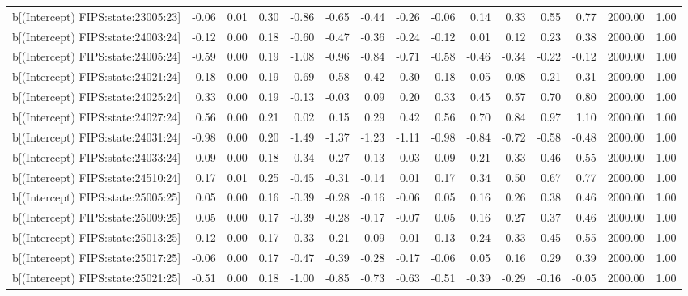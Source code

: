 \begin{table}[ht]
\begin{tabular}{rrrrrrrrrrrrrrr}
  b[(Intercept) FIPS:state:23005:23] & -0.06 & 0.01 & 0.30 & -0.86 & -0.65 & -0.44 & -0.26 & -0.06 & 0.14 & 0.33 & 0.55 & 0.77 & 2000.00 & 1.00 \\ 
  b[(Intercept) FIPS:state:24003:24] & -0.12 & 0.00 & 0.18 & -0.60 & -0.47 & -0.36 & -0.24 & -0.12 & 0.01 & 0.12 & 0.23 & 0.38 & 2000.00 & 1.00 \\ 
  b[(Intercept) FIPS:state:24005:24] & -0.59 & 0.00 & 0.19 & -1.08 & -0.96 & -0.84 & -0.71 & -0.58 & -0.46 & -0.34 & -0.22 & -0.12 & 2000.00 & 1.00 \\ 
  b[(Intercept) FIPS:state:24021:24] & -0.18 & 0.00 & 0.19 & -0.69 & -0.58 & -0.42 & -0.30 & -0.18 & -0.05 & 0.08 & 0.21 & 0.31 & 2000.00 & 1.00 \\ 
  b[(Intercept) FIPS:state:24025:24] & 0.33 & 0.00 & 0.19 & -0.13 & -0.03 & 0.09 & 0.20 & 0.33 & 0.45 & 0.57 & 0.70 & 0.80 & 2000.00 & 1.00 \\ 
  b[(Intercept) FIPS:state:24027:24] & 0.56 & 0.00 & 0.21 & 0.02 & 0.15 & 0.29 & 0.42 & 0.56 & 0.70 & 0.84 & 0.97 & 1.10 & 2000.00 & 1.00 \\ 
  b[(Intercept) FIPS:state:24031:24] & -0.98 & 0.00 & 0.20 & -1.49 & -1.37 & -1.23 & -1.11 & -0.98 & -0.84 & -0.72 & -0.58 & -0.48 & 2000.00 & 1.00 \\ 
  b[(Intercept) FIPS:state:24033:24] & 0.09 & 0.00 & 0.18 & -0.34 & -0.27 & -0.13 & -0.03 & 0.09 & 0.21 & 0.33 & 0.46 & 0.55 & 2000.00 & 1.00 \\ 
  b[(Intercept) FIPS:state:24510:24] & 0.17 & 0.01 & 0.25 & -0.45 & -0.31 & -0.14 & 0.01 & 0.17 & 0.34 & 0.50 & 0.67 & 0.77 & 2000.00 & 1.00 \\ 
  b[(Intercept) FIPS:state:25005:25] & 0.05 & 0.00 & 0.16 & -0.39 & -0.28 & -0.16 & -0.06 & 0.05 & 0.16 & 0.26 & 0.38 & 0.46 & 2000.00 & 1.00 \\ 
  b[(Intercept) FIPS:state:25009:25] & 0.05 & 0.00 & 0.17 & -0.39 & -0.28 & -0.17 & -0.07 & 0.05 & 0.16 & 0.27 & 0.37 & 0.46 & 2000.00 & 1.00 \\ 
  b[(Intercept) FIPS:state:25013:25] & 0.12 & 0.00 & 0.17 & -0.33 & -0.21 & -0.09 & 0.01 & 0.13 & 0.24 & 0.33 & 0.45 & 0.55 & 2000.00 & 1.00 \\ 
  b[(Intercept) FIPS:state:25017:25] & -0.06 & 0.00 & 0.17 & -0.47 & -0.39 & -0.28 & -0.17 & -0.06 & 0.05 & 0.16 & 0.29 & 0.39 & 2000.00 & 1.00 \\ 
  b[(Intercept) FIPS:state:25021:25] & -0.51 & 0.00 & 0.18 & -1.00 & -0.85 & -0.73 & -0.63 & -0.51 & -0.39 & -0.29 & -0.16 & -0.05 & 2000.00 & 1.00 \\ 

\end{tabular}
\end{table}
